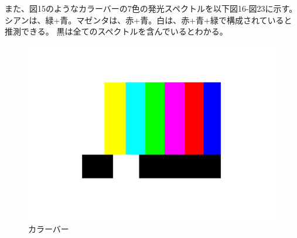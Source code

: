 \documentclass[a4j,twocolumn]{jsarticle}
\begin{document}
また、図15のようなカラーバーの7色の発光スペクトルを以下図16-図23に示す。
シアンは、緑+青。マゼンタは、赤+青。白は、赤+青+緑で構成されていると推測できる。
黒は全てのスペクトルを含んでいるとわかる。
\begin{figure}[htb]
    \centering
    \includegraphics[keepaspectratio,width=0.6\columnwidth]{fig/color.pdf}
    \caption{カラーバー}
\end{figure}
\end{document}
